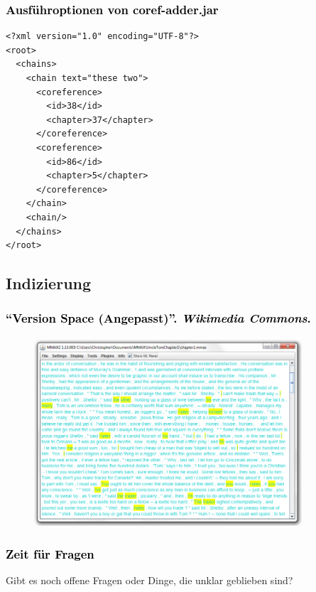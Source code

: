 \documentclass[xcolor=dvipsnames]{beamer}
\begin{document}

\begin{frame}[fragile]\frametitle{\textcolor{black}{Ausführoptionen von coref-adder.jar}}
\begin{small}\begin{verbatim}
<?xml version="1.0" encoding="UTF-8"?>
<root>
  <chains>
    <chain text="these two">
      <coreference>
        <id>38</id>
        <chapter>37</chapter>
      </coreference>
      <coreference>
        <id>86</id>
        <chapter>5</chapter>
      </coreference>
    </chain>
    <chain/>
  </chains>
</root>
\end{verbatim}
\end{small}

\end{frame}


\subsection{Indizierung}


\begin{frame}\frametitle{\textcolor{black}{``{Version Space (Angepasst)}''. \emph{Wikimedia Commons}.}}
\begin{figure}
\includegraphics[height=7cm]{cm_mmax.jpg}
\end{figure}

\end{frame}

\addtocounter{framenumber}{-3}


\begin{frame}[plain]
\frametitle{\textcolor{black}{Zeit für Fragen}}
Gibt es noch offene Fragen oder Dinge, die unklar geblieben sind?
\end{frame}
\end{document}
